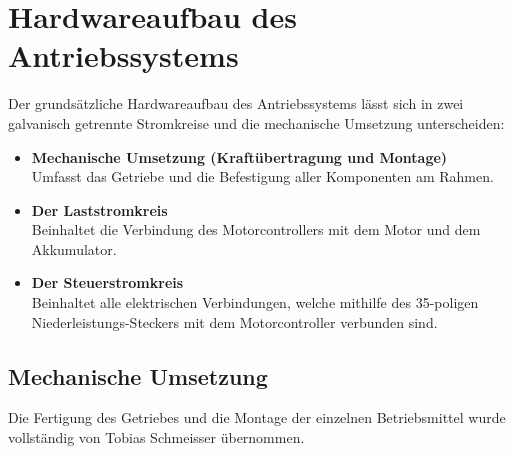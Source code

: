 \newpage

\section{Hardwareaufbau des Antriebssystems}
Der grundsätzliche Hardwareaufbau des Antriebssystems lässt sich in zwei galvanisch getrennte Stromkreise und die mechanische Umsetzung unterscheiden:
\\[5mm]
\begin{itemize}
	\item \textbf{Mechanische Umsetzung (Kraftübertragung und Montage)} 
	\\ \medskip Umfasst das Getriebe und die Befestigung aller Komponenten am Rahmen.
	\medskip
	\item \textbf{Der Laststromkreis}
	\\ \medskip Beinhaltet die Verbindung des Motorcontrollers mit dem Motor und dem Akkumulator.
	\medskip
	\item \textbf{Der Steuerstromkreis}
	\\ \medskip Beinhaltet alle elektrischen Verbindungen, welche mithilfe des 35-poligen
	\\ Niederleistungs-Steckers mit dem Motorcontroller verbunden sind.
\end{itemize}

\newpage



\subsection{Mechanische Umsetzung}
Die Fertigung des Getriebes und die Montage der einzelnen Betriebsmittel wurde vollständig von Tobias Schmeisser übernommen.


\newpage



